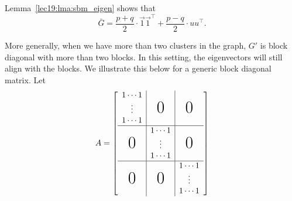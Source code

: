 \begin{remark}
    Lemma~\ref{lec19:lma:sbm_eigen} shows that
    \begin{equation}
        \bar{G} = \frac{p + q}{2} \cdot \vec{1} \vec{1}^\top + \frac{p - q}{2} \cdot u u^\top.
    \end{equation}
\end{remark}
More generally, when we have more than two clusters in the graph, $G'$ is block diagonal with more than two blocks. In this setting, the eigenvectors will still align with the blocks. We illustrate this below for a generic block diagonal matrix. Let 
\begin{align}
    A = \left[
        \begin{array}{c|c|c}
        1 \cdots 1 &&\\
        \vdots & \makebox{\text{\huge 0}} & \makebox{\text{\huge 0}} \\
        1 \cdots 1 &&\\
        \hline
        & 1 \cdots 1 \\
        \makebox{\text{\huge 0}} & \vdots & \makebox{\text{\huge 0}} \\
        & 1 \cdots 1 \\
        \hline
        & & 1 \cdots 1 \\
        \makebox{\text{\huge 0}}& \makebox{\text{\huge 0}} & \vdots \\
        & & 1 \cdots 1
        \end{array}
        \right]
\end{align}

